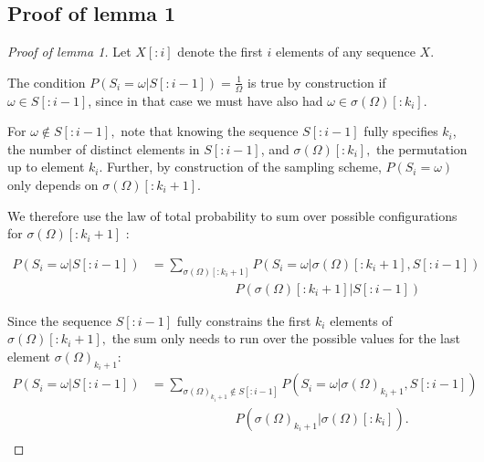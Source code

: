 \documentclass[9pt,twocolumn,twoside,lineno]{gsajnl}
\begin{document}
\subsection{Proof of lemma 1}
\begin{proof} [Proof of lemma 1]
Let $X[:i]$ denote the first $i$ elements of any sequence $X$.

The condition $P(S_i = \omega | S[:i-1] ) = \frac{1}{\Omega}$ is true by construction if $\omega \in S[:i-1] $, since in that case we must have also had $\omega \in \sigma(\Omega)[:k_i]$. 

For $\omega \notin S[:i-1],$  note that knowing the sequence $S[:i-1]$ fully specifies $k_i$, the number of distinct elements in $S[:i-1]$, and $\sigma(\Omega)[:k_i],$ the permutation up to element $k_i.$
Further, by construction of the sampling scheme, $P(S_i = \omega)$ only depends on 
$\sigma(\Omega)[:k_i+1].$   

We therefore use the law of total probability to sum over possible configurations for $\sigma(\Omega)[:k_i+1]$ :


\begin{equation*}
\begin{split}
P(S_i = \omega |S[:i-1]  ) &= \sum_{\sigma(\Omega)[:k_i+1] } P(S_i = \omega |\sigma(\Omega)[:k_i+1] , S[:i-1] ) \\
&~~~~~~~~~~~~~~~~~~~~~~~~~~~~~~P(\sigma(\Omega)[:k_i+1] |S[:i-1] )
\end{split}
\end{equation*}

Since the sequence $S[:i-1]$ fully constrains the first $k_i$ elements of $\sigma(\Omega)[:k_i+1],$ the sum only needs to run over the possible values for the last element $\sigma(\Omega)_{k_i+1}:$
\begin{equation}
\begin{split}
P(S_i = \omega |S[:i-1]  )&= \sum_{\sigma(\Omega)_{k_i+1}\notin S[:i-1]} P(S_i = \omega |\sigma(\Omega)_{k_i+1} , S[:i-1] )\\
&~~~~~~~~~~~~~~~~~~~~~~~~~~~~~~P(\sigma(\Omega)_{k_i+1} |\sigma(\Omega)[:k_i] ).\\
\end{split}
\end{equation}


\end{proof}
\end{document}
